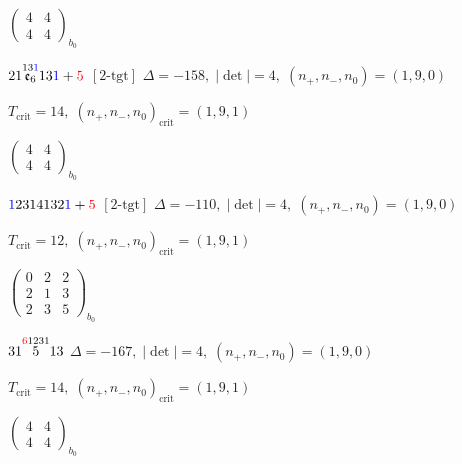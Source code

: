 \documentclass[10pt]{article}
\begin{document}
\hspace{2em}$\left(\begin{smallmatrix}4 & 4 \\ 4 & 4\end{smallmatrix}\right)_{\!b_0}$

\smallskip

$21\overset{13\textcolor{blue}{1}}{\mathfrak{e}_6}13\textcolor{blue}{1}+\textcolor{red}{5}$ $\scriptstyle [2\text{-tgt}]$ \quad $\Delta=-158,\; |\det|=4,\; (n_+,n_-,n_0)=(1,9,0)$

\hspace{1em}$T_{\text{crit}}=14,\; (n_+,n_-,n_0)_{\text{crit}}=(1,9,1)$

\hspace{2em}$\left(\begin{smallmatrix}4 & 4 \\ 4 & 4\end{smallmatrix}\right)_{\!b_0}$

\smallskip

$\textcolor{blue}{1}2314132\textcolor{blue}{1}+\textcolor{red}{5}$ $\scriptstyle [2\text{-tgt}]$ \quad $\Delta=-110,\; |\det|=4,\; (n_+,n_-,n_0)=(1,9,0)$

\hspace{1em}$T_{\text{crit}}=12,\; (n_+,n_-,n_0)_{\text{crit}}=(1,9,1)$

\hspace{2em}$\left(\begin{smallmatrix}0 & 2 & 2 \\ 2 & 1 & 3 \\ 2 & 3 & 5\end{smallmatrix}\right)_{\!b_0}$

\smallskip

$31\overset{\textcolor{red}{6}1231}{5}13$ \quad $\Delta=-167,\; |\det|=4,\; (n_+,n_-,n_0)=(1,9,0)$

\hspace{1em}$T_{\text{crit}}=14,\; (n_+,n_-,n_0)_{\text{crit}}=(1,9,1)$

\hspace{2em}$\left(\begin{smallmatrix}4 & 4 \\ 4 & 4\end{smallmatrix}\right)_{\!b_0}$

\smallskip
\end{document}
